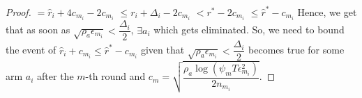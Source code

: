 \begin{proof}
\newline\hspace*{14em}$= \hat{r}_{i} + 4c_{m_{i}} - 2c_{m_{i}} $
\newline\hspace*{14em}$\leq r_{i} + \Delta_{i} - 2c_{m_{i}}$
\newline\hspace*{14em}$< r^{*} -2c_{m_{i}} $
\newline\hspace*{14em}$\leq \hat{r}^{*} - c_{m_{i}}$
\newline Hence, we get that as soon as $\sqrt{\rho_{a}\epsilon_{m_{i}}}<\dfrac{\Delta_{i}}{2}$, $\exists a_{i}$ which gets eliminated.
\newline So, we need to bound the event of $\hat{r}_{i}+c_{m_{i}}\leq \hat{r}^{*}-c_{m_{i}}$ given that $\sqrt{\rho_{a}\epsilon_{m_{i}}}<\dfrac{\Delta_{i}}{2}$ becomes true for some arm $a_{i}$ after the $m$-th round and $c_{m}=\sqrt{\dfrac{\rho_{a}\log (\psi_{m}T\epsilon_{m_{i}}^{2})}{2 n_{m_{i}}}}$.


\end{proof}
